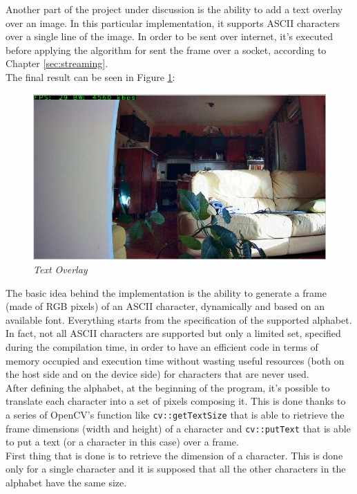 \documentclass[paper=a4, fontsize=10pt]{scrartcl}	%
\begin{document}
	Another part of the project under discussion is the ability to add a text overlay over an image. In this particular implementation, it supports ASCII characters over a single line of the image. In order to be sent over internet, it's executed before applying the algorithm for sent the frame over a socket, according to Chapter \ref{sec:streaming}.\\

	The final result can be seen in Figure \ref{fig:demo_chars}:

	\begin{figure}[H]
		\centering
		\includegraphics[width=0.9\linewidth]{images/chars_ok.png}
		\caption{\textit{Text Overlay}}
		\label{fig:demo_chars}
	\end{figure}

	The basic idea behind the implementation is the ability to generate a frame (made of RGB pixels) of an ASCII character, dynamically and based on an available font. Everything starts from the specification of the supported alphabet. In fact, not all ASCII characters are supported but only a limited set, specified during the compilation time, in order to have an efficient code in terms of memory occupied and execution time without wasting useful resources (both on the host side and on the device side) for characters that are never used.\\

	After defining the alphabet, at the beginning of the program, it's possible to translate each character into a set of pixels composing it. This is done thanks to a series of OpenCV's function like \texttt{cv::getTextSize} that is able to rietrieve the frame dimensions (width and height) of a character and \texttt{cv::putText} that is able to put a text (or a character in this case) over a frame.\\

	First thing that is done is to retrieve the dimension of a character. This is done only for a single character and it is supposed that all the other characters in the alphabet have the same size.\\
\end{document}
